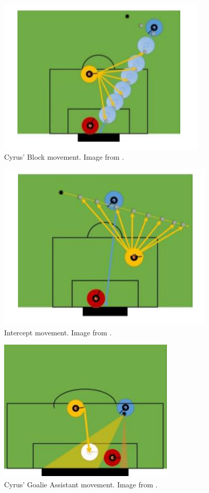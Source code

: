 \begin{figure}[H]
    \centering
    \includegraphics[scale=0.5]{images/cyrus_block.png}
    \caption{Cyrus' Block movement. Image from \cite{cyrus}.}
    \label{fig:cyrus_block}
\end{figure}

\begin{figure}[H]
    \centering
    \includegraphics[scale=0.5]{images/cyrus_intercept.png}
    \caption{Intercept movement. Image from \cite{cyrus}.}
    \label{fig:cyrus_intercept}
\end{figure}

\begin{figure}[H]
    \centering
    \includegraphics[scale=0.5]{images/cyrus_gassist.png}
    \caption{Cyrus' Goalie Assistant movement. Image from \cite{cyrus}.}
    \label{fig:cyrus_gassist}
\end{figure}

